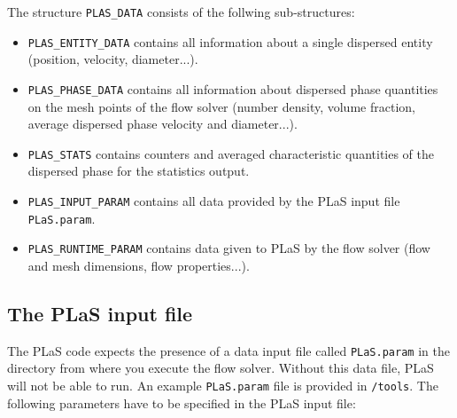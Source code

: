 \documentclass[12pt]{article}
\begin{document}
The structure {\tt{PLAS\_DATA}} consists of the follwing sub-structures:

\begin{itemize}
\item {\tt{PLAS\_ENTITY\_DATA}} contains all information about a single dispersed entity (position, velocity, diameter...).
\item {\tt{PLAS\_PHASE\_DATA}} contains all information about dispersed phase quantities on the mesh points of the flow solver (number density, volume fraction, average dispersed phase velocity and diameter...).
\item {\tt{PLAS\_STATS}} contains counters and averaged characteristic quantities of the dispersed phase for the statistics output.
\item {\tt{PLAS\_INPUT\_PARAM}} contains all data provided by the PLaS input file {\tt{PLaS.param}}.
\item {\tt{PLAS\_RUNTIME\_PARAM}} contains data given to PLaS by the flow solver (flow and mesh dimensions, flow properties...).
\end{itemize}

\subsection{The PLaS input file}
\label{subsec:inpfile}

The PLaS code expects the presence of a data input file called {\tt{PLaS.param}} in the directory from where you execute the flow solver. Without this data file, PLaS will not be able to run. An example {\tt{PLaS.param}} file is provided in {\tt{/tools}}. The following parameters have to be specified in the PLaS input file:
\end{document}
